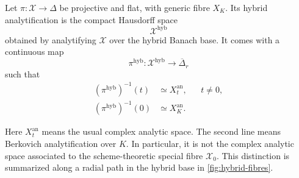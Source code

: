 \begin{definition}
\label{def:hybrid-analytification}
Let $\pi:\mathcal X\to\Delta$ be projective and flat, with generic fibre $X_K$. Its hybrid analytification is the compact Hausdorff space
\[
                         \mathcal X^{\mathrm{hyb}}
\tag{66.6}\label{eq:hybrid-analytification}
\]
obtained by analytifying $\mathcal X$ over the hybrid Banach base. It comes with a continuous map
\[
                \pi^{\mathrm{hyb}}:\mathcal X^{\mathrm{hyb}}
                \longrightarrow\overline\Delta_r
\tag{66.7}\label{eq:hybrid-projection}
\]
such that
\[
 \begin{aligned}
   (\pi^{\mathrm{hyb}})^{-1}(t)&\simeq X_t^{\mathrm{an}},
                      &&t\neq0,\\
   (\pi^{\mathrm{hyb}})^{-1}(0)&\simeq X_K^{\mathrm{an}}.
 \end{aligned}
\tag{66.8}\label{eq:hybrid-fibres}
\]
\end{definition}

Here $X_t^{\mathrm{an}}$ means the usual complex analytic space.
The second line means Berkovich analytification over $K$. In
particular, it is not the complex analytic space associated to the
scheme-theoretic special fibre $\mathcal X_0$.  This distinction is
summarized along a radial path in the hybrid base in
\cref{fig:hybrid-fibres}.


